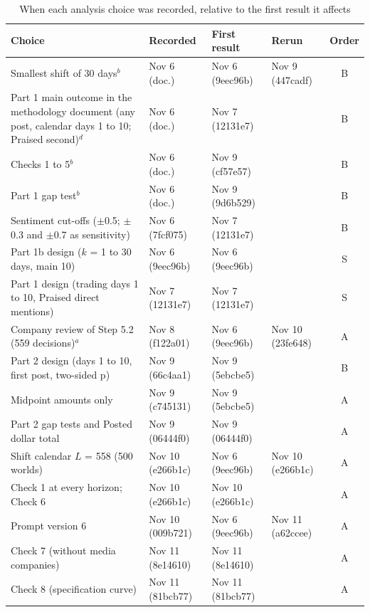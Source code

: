 \begin{table}[htbp]
\centering
{}
\footnotesize
\setlength{\tabcolsep}{3pt}
\caption{When each analysis choice was recorded, relative to the first result it affects}
\label{tab:timeline}
\begin{tabularx}{\linewidth}{@{}>{\raggedright\arraybackslash}Xlllc@{}}
\toprule
Choice & Recorded & First result & Rerun & Order \\
\midrule
Smallest shift of 30 days$^{b}$ & Nov 6 (doc.) & Nov 6 (9eec96b) & Nov 9 (447cadf) & B \\
Part 1 main outcome in the methodology document (any post, calendar days 1 to 10; Praised second)$^{d}$ & Nov 6 (doc.) & Nov 7 (12131e7) &  & B \\
Checks 1 to 5$^{b}$ & Nov 6 (doc.) & Nov 9 (cf57e57) &  & B \\
Part 1 gap test$^{b}$ & Nov 6 (doc.) & Nov 9 (9d6b529) &  & B \\
Sentiment cut-offs ($\pm$0.5; $\pm$0.3 and $\pm$0.7 as sensitivity) & Nov 6 (7fcf075) & Nov 7 (12131e7) &  & B \\
Part 1b design ($k$ = 1 to 30 days, main 10) & Nov 6 (9eec96b) & Nov 6 (9eec96b) &  & S \\
Part 1 design (trading days 1 to 10, Praised direct mentions) & Nov 7 (12131e7) & Nov 7 (12131e7) &  & S \\
Company review of Step 5.2 (559 decisions)$^{a}$ & Nov 8 (f122a01) & Nov 6 (9eec96b) & Nov 10 (23fe648) & A \\
Part 2 design (days 1 to 10, first post, two-sided p) & Nov 9 (66c4aa1) & Nov 9 (5ebcbe5) &  & B \\
Midpoint amounts only & Nov 9 (c745131) & Nov 9 (5ebcbe5) &  & A \\
Part 2 gap tests and Posted dollar total & Nov 9 (06444f0) & Nov 9 (06444f0) &  & A \\
Shift calendar $L$ = 558 (500 worlds) & Nov 10 (e266b1c) & Nov 6 (9eec96b) & Nov 10 (e266b1c) & A \\
Check 1 at every horizon; Check 6 & Nov 10 (e266b1c) & Nov 10 (e266b1c) &  & A \\
Prompt version 6 & Nov 10 (009b721) & Nov 6 (9eec96b) & Nov 11 (a62ccee) & A \\
Check 7 (without media companies) & Nov 11 (8e14610) & Nov 11 (8e14610) &  & A \\
Check 8 (specification curve) & Nov 11 (81bcb77) & Nov 11 (81bcb77) &  & A \\

\end{tabularx}
\end{table}

